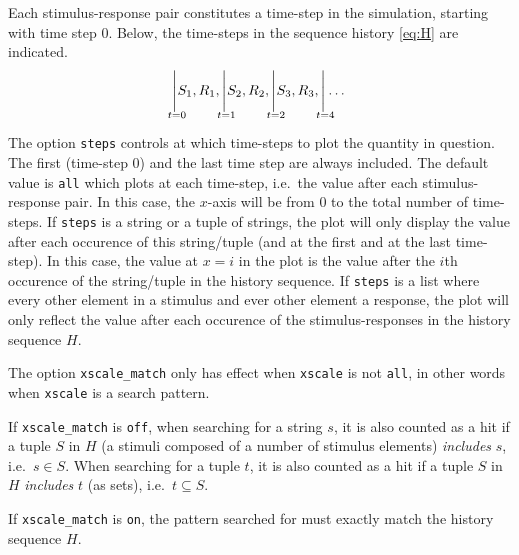 \documentclass[11pt]{article}
\begin{document}
Each stimulus-response pair constitutes a time-step in the simulation, starting with time step 0. Below, the time-steps in the sequence history \eqref{eq:H} are indicated.
\[
\Biggr|_{\mathclap{\substack{\\ \\ t=0}}} S_1, R_1,
\Biggr|_{\mathclap{\substack{\\ \\ t=1}}} S_2, R_2,
\Biggr|_{\mathclap{\substack{\\ \\ t=2}}} S_3, R_3,
\Biggr|_{\mathclap{\substack{\\ \\ t=4}}} \dotsc
\]

The option \verb|steps| controls at which time-steps to plot the quantity in question. The first (time-step 0) and the last time step are always included.
The default value is \verb|all| which plots at each time-step, i.e.\ the value after each stimulus-response pair. In this case, the $x$-axis will be from 0 to the total number of time-steps. If \verb|steps| is a string or a tuple of strings, the plot will only display the value after each occurence of this string/tuple (and at the first and at the last time-step). In this case, the value at $x=i$ in the plot is the value after the $i$th occurence of the string/tuple in the history sequence. If \verb|steps| is a list where every other element in a stimulus and ever other element a response, the plot will only reflect the value after each occurence of the stimulus-responses in the history sequence $H$.

The option \verb|xscale_match| only has effect when \verb|xscale| is not \verb|all|, in other words when \verb|xscale| is a search pattern.

If \verb|xscale_match| is \verb|off|, when searching for a string $s$, it is also counted as a hit if a tuple $S$ in $H$ (a stimuli composed of a number of stimulus elements) \emph{includes} $s$, i.e.\ $s \in S$. When searching for a tuple $t$, it is also counted as a hit if a tuple $S$ in $H$ \emph{includes} $t$ (as sets), i.e.\ $t \subseteq S$.

If \verb|xscale_match| is \verb|on|, the pattern searched for must exactly match the history sequence $H$.
\end{document}

